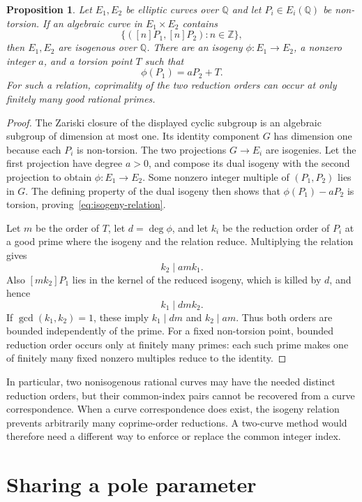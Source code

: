 \documentclass[11pt,a4paper]{article}
\newtheorem{proposition}[theorem]{Proposition}
\theoremstyle{remark}\newtheorem{remark}[theorem]{Remark}
\newcommand{\Q}{\mathbb Q}\newcommand{\Z}{\mathbb Z}
\begin{document}
\begin{proposition}\label{prop:two-curves}
Let $E_1,E_2$ be elliptic curves over $\Q$ and let
$P_i\in E_i(\Q)$ be non-torsion.
If an algebraic curve in $E_1\times E_2$ contains
\[
                  \{([n]P_1,[n]P_2):n\in\Z\},
\]
then $E_1,E_2$ are isogenous over $\Q$.  There are an isogeny
$\phi:E_1\to E_2$, a nonzero integer $a$, and a torsion point
$T$ such that
\begin{equation}\label{eq:isogeny-relation}
                       \phi(P_1)=aP_2+T.
\end{equation}
For such a relation, coprimality of the two reduction orders can
occur at only finitely many good rational primes.
\end{proposition}
\begin{proof}
The Zariski closure of the displayed cyclic subgroup is an
algebraic subgroup of dimension at most one.  Its identity
component $G$ has dimension one because each $P_i$ is non-torsion.
The two projections $G\to E_i$ are isogenies.  Let the first
projection have degree $a>0$, and compose its dual isogeny with
the second projection to obtain $\phi:E_1\to E_2$.
Some nonzero integer multiple of $(P_1,P_2)$ lies in $G$.
The defining property of the dual isogeny then shows that
$\phi(P_1)-aP_2$ is torsion, proving~\eqref{eq:isogeny-relation}.

Let $m$ be the order of $T$, let $d=\deg\phi$, and let $k_i$
be the reduction order of $P_i$ at a good prime where the
isogeny and the relation reduce.  Multiplying the relation gives
\[
                       k_2\mid amk_1.
\]
Also $[mk_2]P_1$ lies in the kernel of the reduced isogeny,
which is killed by $d$, and hence
\[
                       k_1\mid dmk_2.
\]
If $\gcd(k_1,k_2)=1$, these imply $k_1\mid dm$ and $k_2\mid am$.
Thus both orders are bounded independently of the prime.
For a fixed non-torsion point, bounded reduction order occurs
only at finitely many primes: each such prime makes one of
finitely many fixed nonzero multiples reduce to the identity.
\end{proof}

In particular, two nonisogenous rational curves may have the
needed distinct reduction orders, but their common-index pairs
cannot be recovered from a curve correspondence.  When a curve
correspondence does exist, the isogeny relation prevents
arbitrarily many coprime-order reductions.  A two-curve method
would therefore need a different way to enforce or replace
the common integer index.

\section{Sharing a pole parameter}
\end{document}
